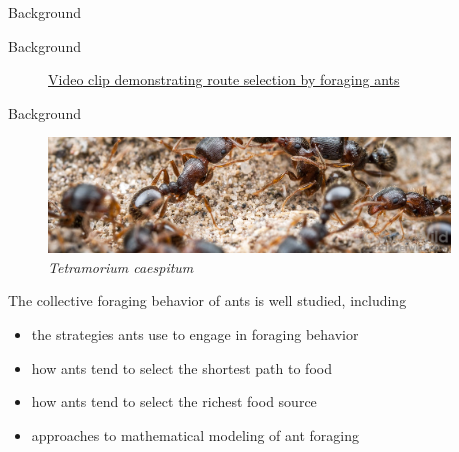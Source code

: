 \begin{subsection}{Background}

\begin{frame}{Background}
	\begin{figure}
		\begin{center}
		\end{center}
		\caption{\href{http://www.youtube.com/v/QeSErcTOLbY?rel=0&amp;showinfo=0}{Video clip demonstrating route selection by foraging ants}}
	\end{figure}
\end{frame}

\begin{frame}{Background}
\begin{figure}
\begin{columns}%
        \begin{column}{0.8\textwidth}%
            \includegraphics[width=\textwidth,right]{images/caespitum16j-XL}
        \end{column}%
        \begin{column}{0.2\textwidth}%
            \caption{\textit{Tetramorium caespitum} \scriptsize{\cite{alexander_wild_caespitum-16j-xl.jpg_????}}}
        \end{column}%
    \end{columns}
\end{figure}
The collective foraging behavior of ants is well studied, including
\begin{itemize}
	\item the strategies ants use to engage in foraging behavior {\scriptsize\cite{camazine_self-organization_2003}}
    \item how ants tend to select the shortest path to food {\scriptsize\cite{camazine_self-organization_2003}}
    \item how ants tend to select the richest food source {\scriptsize\cite{camazine_self-organization_2003}}
    \item approaches to mathematical modeling of ant foraging  {\scriptsize\cite{perna_individual_2012,ryan_model_2016}}
\end{itemize}

\end{frame}
\end{subsection}
